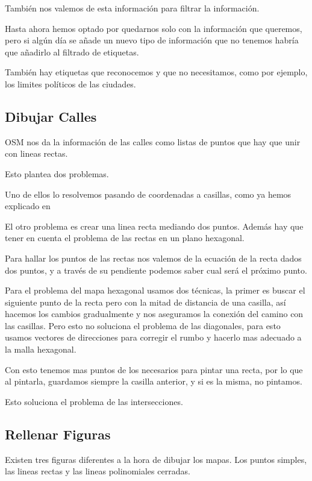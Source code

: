 También nos valemos de esta información para filtrar la información.

Hasta ahora hemos optado por quedarnos solo con la información que queremos,
pero si algún día se añade un nuevo tipo de información que no tenemos habría
que añadirlo al filtrado de etiquetas.

También hay etiquetas que reconocemos y que no necesitamos, como por ejemplo,
los limites políticos de las ciudades.

\subsection*{Dibujar Calles}
OSM nos da la información de las calles como listas de puntos que hay que unir
con lineas rectas.

Esto plantea dos problemas.

Uno de ellos lo resolvemos pasando de coordenadas a casillas, como ya hemos
explicado en %

El otro problema es crear una linea recta mediando dos puntos.
Además hay que tener en cuenta el problema de las rectas en un plano hexagonal.

Para hallar los puntos de las rectas nos valemos de la ecuación de la recta
dados dos puntos, y a través de su pendiente podemos saber cual será el próximo
punto.

Para el problema del mapa hexagonal usamos dos técnicas, la primer es buscar el
siguiente punto de la recta pero con la mitad de distancia de una casilla, así
hacemos los cambios gradualmente y nos aseguramos la conexión del camino con
las casillas.
Pero esto no soluciona el problema de las diagonales, para esto usamos vectores
de direcciones para corregir el rumbo y hacerlo mas adecuado a la malla
hexagonal.

Con esto tenemos mas puntos de los necesarios para pintar una recta, por lo que
al pintarla, guardamos siempre la casilla anterior, y si es la misma, no
pintamos. 

Esto soluciona el problema de las intersecciones.%
\subsection*{Rellenar Figuras}
Existen tres figuras diferentes a la hora de dibujar los mapas.
Los puntos simples, las lineas rectas y las lineas polinomiales cerradas.

